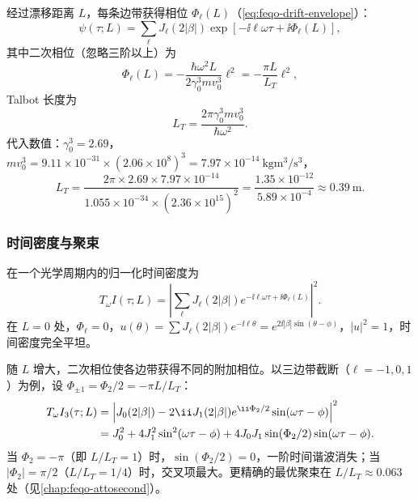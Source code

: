 经过漂移距离 $L$，每条边带获得相位 $\Phi_\ell(L)$（\cref{eq:feqo-drift-envelope}）：
\begin{equation}
\psi(\tau;L)=\sum_\ell J_\ell(2|\beta|)\exp\!\left[-\ii\ell\omega\tau+\ii\Phi_\ell(L)\right],
\label{eq:feqo-pinem-after-drift}
\end{equation}
其中二次相位（忽略三阶以上）为
\begin{equation}
\Phi_\ell(L)=-\frac{\hbar\omega^2 L}{2\gamma_0^3mv_0^3}\ell^2
=-\frac{\pi L}{L_T}\ell^2,
\label{eq:feqo-pinem-quadratic-phase}
\end{equation}
Talbot 长度为
\begin{equation}
L_T=\frac{2\pi\gamma_0^3mv_0^3}{\hbar\omega^2}.
\label{eq:feqo-talbot-length}
\end{equation}
代入数值：$\gamma_0^3=2.69$，$mv_0^3=9.11\times10^{-31}\times(2.06\times10^8)^3=7.97\times10^{-14}\ \si{\kilo\gram\metre\cubed\per\second\cubed}$，
\begin{equation}
L_T=\frac{2\pi\times2.69\times7.97\times10^{-14}}{1.055\times10^{-34}\times(2.36\times10^{15})^2}
=\frac{1.35\times10^{-12}}{5.89\times10^{-4}}
\approx 0.39\ \si{\metre}.
\label{eq:feqo-talbot-numerical}
\end{equation}

\subsubsection{时间密度与聚束}

在一个光学周期内的归一化时间密度为
\begin{equation}
T_\omega I(\tau;L)=\left|\sum_\ell J_\ell(2|\beta|)e^{-\ii\ell\omega\tau+\ii\Phi_\ell(L)}\right|^2.
\label{eq:feqo-pinem-temporal-density}
\end{equation}
在 $L=0$ 处，$\Phi_\ell=0$，$u(\theta)=\sum J_\ell(2|\beta|)e^{-\ii\ell\theta}=e^{2\ii|\beta|\sin(\theta-\phi)}$，$|u|^2=1$，时间密度完全平坦。

随 $L$ 增大，二次相位使各边带获得不同的附加相位。以三边带截断（$\ell=-1,0,1$）为例，设 $\Phi_{\pm1}=\Phi_2/2=-\pi L/L_T$：
\begin{align}
T_\omega I_3(\tau;L)&=\left|J_0(2|\beta|)-2\ii J_1(2|\beta|)e^{\ii\Phi_2/2}\sin(\omega\tau-\phi)\right|^2\notag\\
&=J_0^2+4J_1^2\sin^2(\omega\tau-\phi)+4J_0 J_1\sin(\Phi_2/2)\sin(\omega\tau-\phi).
\label{eq:feqo-three-sideband-density}
\end{align}
当 $\Phi_2=-\pi$（即 $L/L_T=1$）时，$\sin(\Phi_2/2)=0$，一阶时间谐波消失；当 $|\Phi_2|=\pi/2$（$L/L_T=1/4$）时，交叉项最大。更精确的最优聚束在 $L/L_T\approx 0.063$ 处（见\cref{chap:feqo-attosecond}）。

